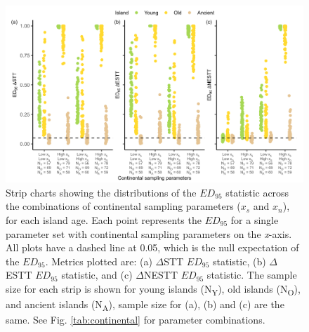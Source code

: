 \documentclass{article}
\begin{document}
\begin{figure}
    \centering
    \includegraphics[width=\textwidth]{JBI-21-0508_Fig6.png}
    \caption{Strip charts showing the distributions of the $ED_{95}$ statistic across the combinations of continental sampling parameters ($x_s$ and $x_n$), for each island age. Each point represents the $ED_{95}$ for a single parameter set with continental sampling parameters on the \textit{x}-axis. All plots have a dashed line at 0.05, which is the null expectation of the $ED_{95}$. Metrics plotted are: (a) $\Delta$STT $ED_{95}$ statistic, (b) $\Delta$ESTT $ED_{95}$ statistic, and (c) $\Delta$NESTT $ED_{95}$ statistic. The sample size for each strip is shown for young islands (N\textsubscript{Y}), old islands (N\textsubscript{O}), and ancient islands (N\textsubscript{A}), sample size for (a), (b) and (c) are the same. See Fig. \ref{tab:continental} for parameter combinations.}
    \label{fig:continental_facet}
\end{figure}

\clearpage
\end{document}
